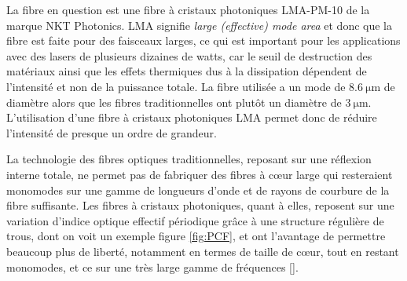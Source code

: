\documentclass[11pt,a4paper]{article}
\newcommand{\ncite}[1]{[\citenum{#1}]}
\begin{document}
La fibre en question est une fibre à cristaux photoniques LMA-PM-10 de la marque NKT Photonics. LMA signifie \textit{large (effective) mode area} et donc que la fibre est faite pour des faisceaux larges, ce qui est important pour les applications avec des lasers de plusieurs dizaines de watts, car le seuil de destruction des matériaux ainsi que les effets thermiques dus à la dissipation dépendent de l'intensité et non de la puissance totale. La fibre utilisée a un mode de $\SI{8.6}{\micro\meter}$ de diamètre alors que les fibres traditionnelles ont plutôt un diamètre de $\SI{3}{\micro\meter}$. L'utilisation d'une fibre à cristaux photoniques LMA permet donc de réduire l'intensité de presque un ordre de grandeur.

La technologie des fibres optiques traditionnelles, reposant sur une réflexion interne totale, ne permet pas de fabriquer des fibres à c\oe ur large qui resteraient monomodes sur une gamme de longueurs d'onde et de rayons de courbure de la fibre suffisante. 
Les fibres à cristaux photoniques, quant à elles, reposent sur une variation d'indice optique effectif périodique grâce à une structure régulière de trous, dont on voit un exemple figure \ref{fig:PCF}, et ont l'avantage de permettre beaucoup plus de liberté, notamment en termes de taille de c\oe ur, tout en restant monomodes, et ce sur une très large gamme de fréquences \ncite{russell2006,russell2007}.

\end{document}
